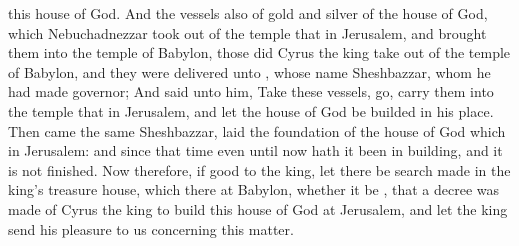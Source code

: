 {this
house of
God.
And the
vessels
also
of
gold and
silver of the
house of
God, which
Nebuchadnezzar
took out
of the
temple that
{} in
Jerusalem, and
brought them into the
temple of
Babylon,
those did
Cyrus the
king
take out
of the
temple of
Babylon, and they were
delivered unto
{}, whose
name
{}
Sheshbazzar, whom he had
made
governor;
And
said unto him,
Take
these
vessels,
go,
carry
them into the
temple that
{} in
Jerusalem, and let the
house of
God be
builded
in his
place.
Then
came the
same
Sheshbazzar,
{}
laid the
foundation of the
house of
God which
{} in
Jerusalem: and
since that
time even
until
now hath it been in
building, and
{} it is
not
finished.
Now therefore,
if
{}
good
to the
king, let there be
search made in the
king’s
treasure
house, which
{}
there at
Babylon,
whether it
be
{}, that a
decree was
made
of
Cyrus the
king to
build
this
house of
God at
Jerusalem, and let the
king
send his
pleasure to us
concerning this
matter.

}
